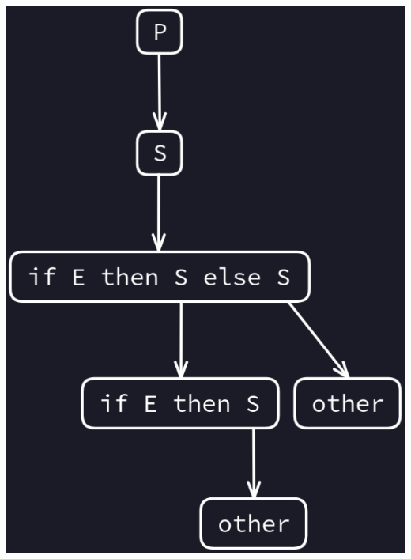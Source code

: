\documentclass{article}
\begin{document}
\begin{itemize}
\begin{center}
        \includegraphics[scale=0.35]{image5.png}
    \end{center}
\end{itemize}
\end{document}
